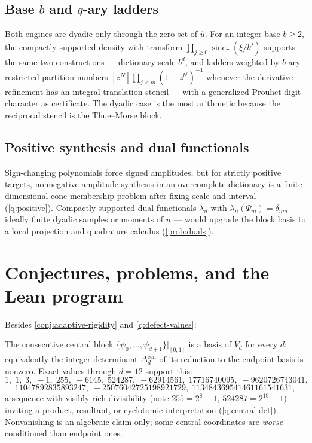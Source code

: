 \documentclass[11pt,oneside]{article}
\numberwithin{equation}{section}
\theoremstyle{definition}
\theoremstyle{remark}
\newcommand{\sincpi}{\operatorname{sinc}_{\pi}}
\begin{document}
\subsection{Base $b$ and $q$-ary ladders}
Both engines are dyadic only through the zero set of
$\widehat u$.  For an integer base $b\ge2$, the compactly supported
density with transform $\prod_{j\ge0}\sincpi(\xi/b^{j})$ supports the
same two constructions --- dictionary scale $b^{d}$, and ladders
weighted by $b$-ary restricted partition numbers
$[z^{N}]\prod_{j<m}(1-z^{b^{j}})^{-1}$ whenever the derivative
refinement has an integral translation stencil --- with a generalized
Prouhet digit character as certificate.  The dyadic case is the most
arithmetic because the reciprocal stencil is the Thue--Morse block.

\subsection{Positive synthesis and dual functionals}
Sign-changing polynomials force signed amplitudes, but for strictly
positive targets, nonnegative-amplitude synthesis in an overcomplete
dictionary is a finite-dimensional cone-membership problem after
fixing scale and interval (\cref{q:positive}).  Compactly supported
dual functionals $\lambda_n$ with
$\lambda_n(\Psi_m)=\delta_{nm}$ --- ideally finite dyadic samples or
moments of $u$ --- would upgrade the block basis to a local
projection and quadrature calculus (\cref{prob:duals}).

\section{Conjectures, problems, and the Lean program}
\label{sec:frontiers-poly}

Besides \cref{conj:adaptive-rigidity} and
\cref{q:defect-values}:

\begin{conjecture}
\label{conj:central-basis}
The consecutive central block
$\{\psi_0,\dots,\psi_{d+1}\}|_{[0,1]}$ is a basis of $V_d$ for every
$d$; equivalently the integer determinant
$\Delta^{\mathrm{cen}}_d$ of its reduction to the endpoint basis is
nonzero.  Exact values through $d=12$ support this:
\[
 1,\;1,\;3,\;-1,\;255,\;-6145,\;524287,\;-62914561,\;
 17716740095,\;-9620726743041,
\]
\[
 11047892835893247,\;-25076042725198921729,\;
 113484369541461161541631,
\]
a sequence with visibly rich divisibility (note
$255=2^{8}-1$, $524287=2^{19}-1$) inviting a product, resultant, or
cyclotomic interpretation (\cref{q:central-det}).  Nonvanishing is an
algebraic claim only; some central coordinates are \emph{worse}
conditioned than endpoint ones.
\end{conjecture}
\end{document}

